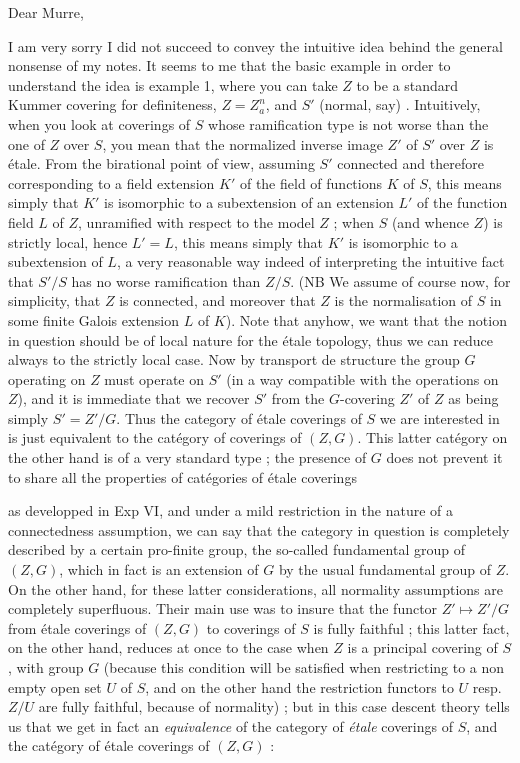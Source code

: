 \documentclass[11pt,a4paper]{article}
\begin{document}
Dear Murre,

I am very sorry I did not succeed to convey the intuitive idea behind the
general nonsense of my notes. It seems to me that the basic example in order to
understand the idea is example 1, where you can take $Z$ to be a standard
Kummer covering for definiteness, $Z = Z^n_a$, and $S'$ (normal, say)
. Intuitively, when you look at coverings of $S$ whose
ramification type is not worse than the one of $Z$ over $S$, you mean that the
normalized inverse image $Z'$ of $S'$ over $Z$ is étale. \struck{\ill{}} From
the birational point of view, assuming $S'$ connected and therefore
corresponding to a field extension $K'$ of the field of functions $K$ of $S$,
this means simply that $K'$ is isomorphic to a subextension of an extension
$L'$ of the function field $L$ of $Z$, unramified with respect to the model
$Z$ ; when $S$ (and whence $Z$) is strictly local, hence $L'=L$, this means
simply that $K'$ is isomorphic to a subextension of $L$, a very reasonable way
indeed of interpreting the intuitive fact that $S'/S$ has no worse ramification
than $Z/S$. (NB We assume of course now, for simplicity, that $Z$ is connected,
and moreover that $Z$ is the normalisation of $S$ in some finite Galois
extension $L$ of $K$). Note that anyhow, we want that the notion in question
should be of local nature for the étale topology, thus we can reduce always to
the strictly local case. Now by transport de structure the group $G$ operating
on $Z$ must operate on $S'$ (in a way compatible with the operations on $Z$),
and it is immediate that we recover $S'$ from the $G$-covering $Z'$ of $Z$ as
being simply $S'=Z'/G$. Thus the category of \struck{\ill{}} étale coverings of
$S$ we are interested in is just equivalent to the catégory of coverings of
$(Z,G)$. This latter catégory on the other hand is of a very standard type ;
the presence of $G$ does not prevent it to share all the properties of
catégories of étale coverings

as developped in Exp VI, and under a mild restriction in the nature of a
connectedness assumption, we can say that the category in question is
 completely described by a certain pro-finite group, the
so-called fundamental group of $(Z,G)$, which in fact is an extension of $G$ by
the usual fundamental group of $Z$. On the other hand, for these latter
considerations, all normality assumptions are completely superfluous. Their
main use was to insure that the functor $Z' \mapsto Z'/G$ from étale coverings
of $(Z,G)$ to coverings of $S$ is fully faithful ; this latter fact, on the
other hand, reduces at once to the case when $Z$ is a principal covering of
$S$, with group $G$ (because this condition will be satisfied when restricting
to a non empty open set $U$ of $S$, and on the other hand the restriction
functors \struck{\ill{}} to $U$ resp.\ $Z/U$ are fully faithful, because of
normality) ; but in this case descent theory tells us that we get in fact an
\emph{equivalence} of the category of \emph{étale} coverings of $S$, and the
catégory of étale coverings of $(Z,G)$ :
\end{document}

